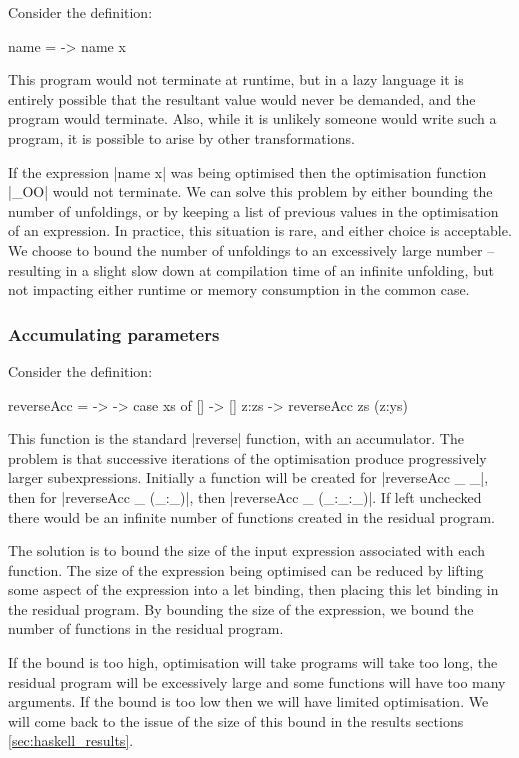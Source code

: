 \documentclass{llncs}
\begin{document}
Consider the definition:

\begin{code}
name = \x -> name x
\end{code}

This program would not terminate at runtime, but in a lazy language it is entirely possible that the resultant value would never be demanded, and the program would terminate. Also, while it is unlikely someone would write such a program, it is possible to arise by other transformations.

If the expression |name x| was being optimised then the optimisation function |_OO| would not terminate. We can solve this problem by either bounding the number of unfoldings, or by keeping a list of previous values in the optimisation of an expression. In practice, this situation is rare, and either choice is acceptable. We choose to bound the number of unfoldings to an excessively large number -- resulting in a slight slow down at compilation time of an infinite unfolding, but not impacting either runtime or memory consumption in the common case.

\subsubsection{Accumulating parameters}

Consider the definition:

\begin{code}
reverseAcc = \xs -> \ys -> case  xs of
                                 []    -> []
                                 z:zs  -> reverseAcc zs (z:ys)
\end{code}

This function is the standard |reverse| function, with an accumulator. The problem is that successive iterations of the optimisation produce progressively larger subexpressions. Initially a function will be created for |reverseAcc _ _|, then for |reverseAcc _ (_:_)|, then |reverseAcc _ (_:_:_)|. If left unchecked there would be an infinite number of functions created in the residual program.

The solution is to bound the size of the input expression associated with each function. The size of the expression being optimised can be reduced by lifting some aspect of the expression into a let binding, then placing this let binding in the residual program. By bounding the size of the expression, we bound the number of functions in the residual program.

If the bound is too high, optimisation will take programs will take too long, the residual program will be excessively large and some functions will have too many arguments. If the bound is too low then we will have limited optimisation. We will come back to the issue of the size of this bound in the results sections \ref{sec:haskell_results}.
\end{document}
